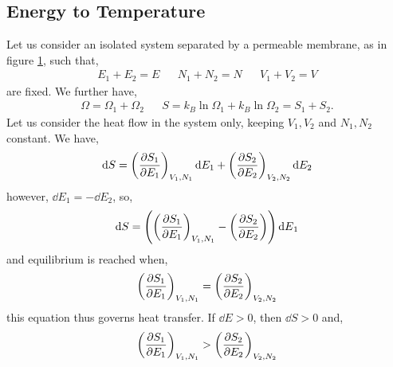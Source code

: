 \documentclass{book}
\begin{document}
\subsection{Energy to Temperature}
\begin{figure}
	\centering
	\caption{}
	\label{fig:isolated}
\end{figure}
Let us consider an isolated system separated by a permeable membrane, as in figure \ref{fig:isolated}, such that,
\begin{align}
	E_1 + E_2 = E && N_1 + N_2 = N && V_1 + V_2 = V
\end{align}
are fixed. We further have,
\begin{align}
	\Omega = \Omega_1 + \Omega_2 && S = k_B\ln\Omega_1 + k_B\ln\Omega_2 = S_1 + S_2.
\end{align}
Let us consider the heat flow in the system only, keeping $V_1,V_2$ and $N_1,N_2$ constant. We have,
\begin{equation}
	\dd{S} = \left(\pdv{S_1}{E_1}\right)_{V_1,N_1}\dd{E_1} + \left(\pdv{S_2}{E_2}\right)_{V_2,N_2}\dd{E_2}
\end{equation}
however, $\dd{E}_1 = - \dd{E}_2$, so,
\begin{equation}
	\dd{S} = \left(\left(\pdv{S_1}{E_1}\right)_{V_1,N_1} - \left(\pdv{S_2}{E_2}\right)\right)\dd{E}_1
\end{equation}
and equilibrium is reached when,
\begin{equation}
	\left(\pdv{S_1}{E_1}\right)_{V_1,N_1} = \left(\pdv{S_2}{E_2}\right)_{V_2,N_2}
\end{equation}
this equation thus governs heat transfer. If $\dd{E} > 0$, then $\dd{S} >0$ and,
\begin{equation}
	\left(\pdv{S_1}{E_1}\right)_{V_1,N_1} > \left(\pdv{S_2}{E_2}\right)_{V_2,N_2}
\end{equation}
\end{document}
